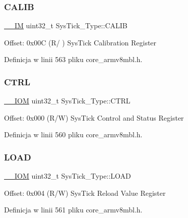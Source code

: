 \subsubsection{\texorpdfstring{C\+A\+L\+IB}{CALIB}}
{\footnotesize\ttfamily \hyperlink{core__sc300_8h_a4cc1649793116d7c2d8afce7a4ffce43}{\+\_\+\+\_\+\+IM} uint32\+\_\+t Sys\+Tick\+\_\+\+Type\+::\+C\+A\+L\+IB}

Offset\+: 0x00C (R/ ) Sys\+Tick Calibration Register 

Definicja w linii 563 pliku core\+\_\+armv8mbl.\+h.

\mbox{\label{struct_sys_tick___type_a875e7afa5c4fd43997fb544a4ac6e37e}} 
\subsubsection{\texorpdfstring{C\+T\+RL}{CTRL}}
{\footnotesize\ttfamily \hyperlink{core__sc300_8h_ab6caba5853a60a17e8e04499b52bf691}{\+\_\+\+\_\+\+I\+OM} uint32\+\_\+t Sys\+Tick\+\_\+\+Type\+::\+C\+T\+RL}

Offset\+: 0x000 (R/W) Sys\+Tick Control and Status Register 

Definicja w linii 560 pliku core\+\_\+armv8mbl.\+h.

\mbox{\label{struct_sys_tick___type_a4780a489256bb9f54d0ba8ed4de191cd}} 
\subsubsection{\texorpdfstring{L\+O\+AD}{LOAD}}
{\footnotesize\ttfamily \hyperlink{core__sc300_8h_ab6caba5853a60a17e8e04499b52bf691}{\+\_\+\+\_\+\+I\+OM} uint32\+\_\+t Sys\+Tick\+\_\+\+Type\+::\+L\+O\+AD}

Offset\+: 0x004 (R/W) Sys\+Tick Reload Value Register 

Definicja w linii 561 pliku core\+\_\+armv8mbl.\+h.

\mbox{\label{struct_sys_tick___type_a9b5420d17e8e43104ddd4ae5a610af93}} 
